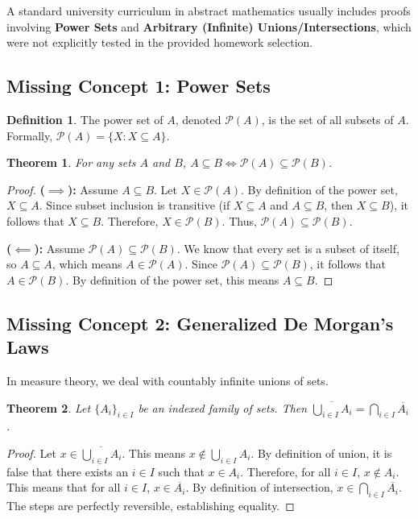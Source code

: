 \documentclass[11pt]{article}
\newtheorem{theorem}{Theorem}[section]
\theoremstyle{definition}
\newtheorem{definition}{Definition}[section]
\theoremstyle{remark}
\begin{document}
A standard university curriculum in abstract mathematics usually includes proofs involving \textbf{Power Sets} and \textbf{Arbitrary (Infinite) Unions/Intersections}, which were not explicitly tested in the provided homework selection.

\subsection{Missing Concept 1: Power Sets}
\begin{definition}
The power set of $A$, denoted $\mathcal{P}(A)$, is the set of all subsets of $A$. Formally, $\mathcal{P}(A) = \{X : X \subseteq A\}$.
\end{definition}

\begin{theorem}
For any sets $A$ and $B$, $A \subseteq B \iff \mathcal{P}(A) \subseteq \mathcal{P}(B)$.
\end{theorem}
\begin{proof}
\textbf{($\implies$):} Assume $A \subseteq B$. Let $X \in \mathcal{P}(A)$. By definition of the power set, $X \subseteq A$. Since subset inclusion is transitive (if $X \subseteq A$ and $A \subseteq B$, then $X \subseteq B$), it follows that $X \subseteq B$. Therefore, $X \in \mathcal{P}(B)$. Thus, $\mathcal{P}(A) \subseteq \mathcal{P}(B)$.

\textbf{($\impliedby$):} Assume $\mathcal{P}(A) \subseteq \mathcal{P}(B)$. We know that every set is a subset of itself, so $A \subseteq A$, which means $A \in \mathcal{P}(A)$. Since $\mathcal{P}(A) \subseteq \mathcal{P}(B)$, it follows that $A \in \mathcal{P}(B)$. By definition of the power set, this means $A \subseteq B$.
\end{proof}

\subsection{Missing Concept 2: Generalized De Morgan's Laws}
In measure theory, we deal with countably infinite unions of sets.
\begin{theorem}
Let $\{A_i\}_{i \in I}$ be an indexed family of sets. Then $\overline{\bigcup_{i \in I} A_i} = \bigcap_{i \in I} \overline{A_i}$.
\end{theorem}
\begin{proof}
Let $x \in \overline{\bigcup_{i \in I} A_i}$. This means $x \notin \bigcup_{i \in I} A_i$. 
By definition of union, it is false that there exists an $i \in I$ such that $x \in A_i$. 
Therefore, for all $i \in I$, $x \notin A_i$. 
This means that for all $i \in I$, $x \in \overline{A_i}$. 
By definition of intersection, $x \in \bigcap_{i \in I} \overline{A_i}$. 
The steps are perfectly reversible, establishing equality.
\end{proof}
\end{document}
